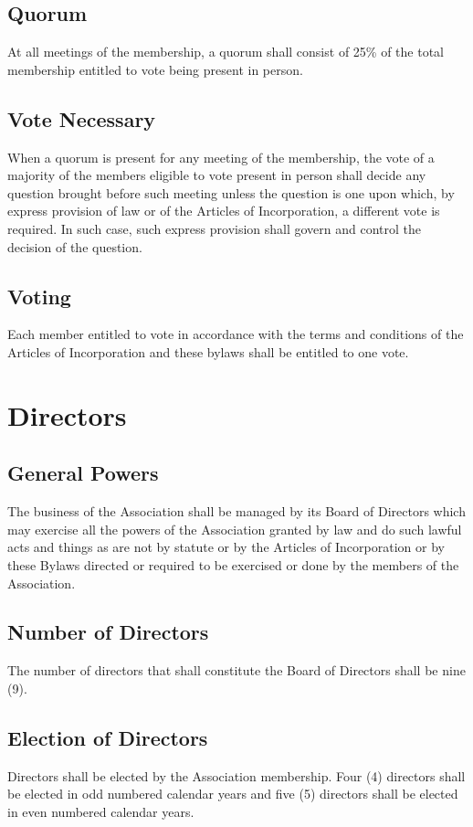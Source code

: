 \documentclass[letterpaper,11pt]{article}
\begin{document}
\subsection{Quorum}
At all meetings of the membership, a quorum shall consist of 25\% of the total membership entitled to vote being present in person.
\subsection{Vote Necessary}
When a quorum is present for any meeting of the membership, the vote of a majority of the members eligible to vote present in person shall decide any question brought before such meeting unless the question is one upon which, by express provision of law or of the Articles of Incorporation, a different vote is required. In such case, such express provision shall govern and control the decision of the question.
\subsection{Voting}
Each member entitled to vote in accordance with the terms and conditions of the Articles of Incorporation and these bylaws shall be entitled to one vote.
\section{Directors}
\subsection{General Powers}
The business of the Association shall be managed by its Board of Directors which may exercise all the powers of the Association granted by law and do such lawful acts and things as are not by statute or by the Articles of Incorporation or by these Bylaws directed or required to be exercised or done by the members of the Association.
\subsection{Number of Directors}
The number of directors that shall constitute the Board of Directors shall be nine (9).
\subsection{Election of Directors}
Directors shall be elected by the Association membership. Four (4) directors shall be elected in odd numbered calendar years and five (5) directors shall be elected in even numbered calendar years.
\end{document}
